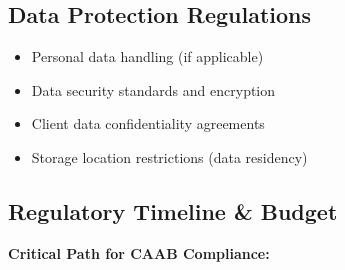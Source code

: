 \subsection{Data Protection Regulations}

\begin{itemize}
    \item Personal data handling (if applicable)
    \item Data security standards and encryption
    \item Client data confidentiality agreements
    \item Storage location restrictions (data residency)
\end{itemize}

\subsection{Regulatory Timeline \& Budget}

\textbf{Critical Path for CAAB Compliance:}

